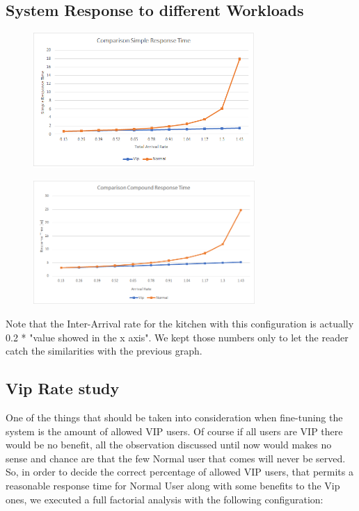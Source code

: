 \subsection{System Response to different Workloads}

\begin{figure}[H]
    \centering
    \includegraphics[width=0.75\textwidth]{figs/workloadSimple.png}
\end{figure}

\begin{figure}[H]
    \centering
    \includegraphics[width=0.75\textwidth]{figs/workloadCompound.png}
\end{figure}

Note that the Inter-Arrival rate for the kitchen with this configuration is actually 0.2 * "value showed in the x axis". We kept those numbers only to let the reader catch the similarities with the previous graph. %

\subsection{Vip Rate study}

One of the things that should be taken into consideration when fine-tuning the system is the amount of allowed VIP users. Of course if all users are VIP there would be no benefit, all the observation discussed until now would makes no sense and chance are that the few Normal user that comes will never be served. So, in order to decide the correct percentage of allowed VIP users, that permits a reasonable response time for Normal User along with some benefits to the Vip ones, we executed a full factorial analysis with the following configuration:
 
